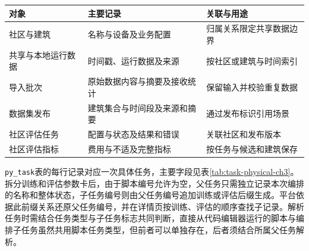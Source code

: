 \begin{table}[!htbp]
    \centering
    \label{tab:community-storage}
    \begin{tabular}{P{8em}P{11em}P{10em}}
        \toprule
        对象        & 主要记录           & 关联与用途        \\ \midrule
        社区与建筑     & 名称与设备及业务配置     & 归属关系限定共享数据边界 \\
        共享与本地运行数据 & 时间戳、运行数据及来源    & 按社区或建筑与时间索引  \\
        导入批次      & 原始数据内容与摘要及接收统计 & 保留输入并校验重复数据  \\
        数据集发布     & 建筑集合与时间段及来源和摘要 & 通过发布标识引用场景   \\
        社区评估任务    & 配置与状态及结果和错误    & 关联社区和发布版本    \\
        社区评估指标    & 费用与不适及完整指标     & 按任务与候选和建筑保存  \\
        \bottomrule
    \end{tabular}
\end{table}

\texttt{py\_task}表的每行记录对应一次具体任务，主要字段见表\ref{tab:task-physical-ch3}。拆分训练和评估参数卡后，由于脚本编号允许为空，父任务只需独立记录本次编排的名称和整体状态，子任务编号则由父任务编号追加训练或评估后缀生成。平台依据此前缀关系还原父任务编号，并在详情页按训练、评估的顺序查找子记录。解析任务时需结合任务类型与子任务标志共同判断，直接从代码编辑器运行的脚本与编排子任务虽然共用脚本任务类型，但前者可以单独存在，后者须结合所属父任务解析。

